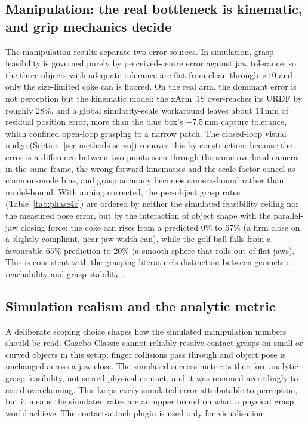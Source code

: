 \subsection{Manipulation: the real bottleneck is kinematic, and grip mechanics decide}
The manipulation results separate two error sources. In simulation, grasp feasibility is
governed purely by perceived-centre error against jaw tolerance, so the three objects with
adequate tolerance are flat from clean through $\times10$ and only the size-limited coke can
is floored. On the real arm, the dominant error is not perception but the kinematic model:
the xArm~1S over-reaches its URDF by roughly 28\%, and a global similarity-scale workaround
leaves about $14$\,mm of residual position error, more than the blue box's $\pm7.5$\,mm
capture tolerance, which confined open-loop grasping to a narrow patch. The closed-loop
visual nudge (Section~\ref{sec:methods-servo}) removes this by construction: because the
error is a difference between two points seen through the same overhead camera in the same
frame, the wrong forward kinematics and the scale factor cancel as common-mode bias, and
grasp accuracy becomes camera-bound rather than model-bound. With aiming corrected, the
per-object grasp rates (Table~\ref{tab:phase4c}) are ordered by neither the simulated
feasibility ceiling nor the measured pose error, but by the interaction of object shape with
the parallel-jaw closing force: the coke can rises from a predicted 0\% to 67\% (a firm close
on a slightly compliant, near-jaw-width can), while the golf ball falls from a favourable
65\% prediction to 20\% (a smooth sphere that rolls out of flat jaws). This is consistent
with the grasping literature's distinction between geometric reachability and grasp
stability \cite{bohg2014grasp}.

\subsection{Simulation realism and the analytic metric}
A deliberate scoping choice shapes how the simulated manipulation numbers should be read.
Gazebo Classic \cite{koenig2004gazebo} cannot reliably resolve contact grasps on small or
curved objects in this setup; finger collisions pass through and object pose is unchanged
across a jaw close. The simulated success metric is therefore analytic grasp feasibility,
not scored physical contact, and it was renamed accordingly to avoid overclaiming. This
keeps every simulated error attributable to perception, but it means the simulated rates are
an upper bound on what a physical grasp would achieve. The contact-attach plugin
\cite{link_attacher} is used only for visualisation.

